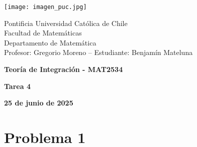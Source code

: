 \documentclass{article}
\begin{document}
\begin{minipage}{2.5cm}
    \texttt{[image: imagen\_puc.jpg]}
\end{minipage}
\begin{minipage}{14cm}
    {\sc Pontificia Universidad Católica de Chile\\
    Facultad de Matemáticas\\
    Departamento de Matemática\\
    Profesor: Gregorio Moreno -- Estudiante: Benjamín Mateluna}
\end{minipage}
\vspace{1ex}

{\centerline{\bf Teoría de Integración - MAT2534}
\centerline{\bf Tarea 4}}
\centerline{\bf 25 de junio de 2025}

\section*{Problema 1}
\end{document}
